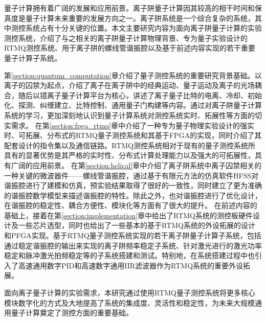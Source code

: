 
\begin{conclusion}

量子计算拥有着广阔的发展和应用前景。离子阱量子计算因其较高的相干时间和保真度是量子计算未来重要的发展方向之一。离子阱系统是一个综合复杂的系统，其中测控系统占有十分关键的位置。本文主要研究内容为面向离子阱量子计算的实验测控系统，介绍了与之相关的离子阱量子计算物理背景、专为量子实验设计的RTMQ测控系统、用于离子阱的螺线管谐振腔以及基于前述内容实现的若干重要量子计算子系统。

第\ref{section:quantum_computation}章介绍了量子测控系统的重要研究背景基础。以离子的囚禁为起点，介绍了离子在离子阱中的经典运动、量子运动及离子的光场耦合，随后以镱离子量子计算平台为核心，讲述了离子量子比特的电离、冷却、初始化、探测、纠缠建立、比特控制、通用量子门构建等内容。通过对离子阱量子计算系统的学习，更加深刻地认识到量子计算系统对测控系统实时、拓展性等方面的切实需求。
在第\ref{section:fpga_rtmq}章中介绍了一种专为量子物理实验设计的强实时、可拓展、分布式的RTMQ量子测控系统和其基于FPGA的实现，同时介绍了其配套设计的指令集以及通信链路。RTMQ测控系统相对于现有的量子测控系统所具有的显著优势是其严格的实时性、分布式计算处理能力以及强大的可拓展性，具有广阔的应用前景。
在第\ref{section:helical}章中介绍了离子阱系统中离子囚禁相关的一种关键的微波器件——螺线管谐振腔，通过基于有限元方法的仿真软件HFSS对谐振腔进行了建模和仿真，预实验结果取得了很好的一致性，同时建立了更为准确的谐振腔数学模型来描述谐振腔的特性。除此之外，也对谐振腔进行了优化设计，在谐振腔的稳定性、耦合方便性、模块化等方面有了很大的提升。
在前述内容的基础上，接着在第\ref{section:implementation}章中给出了RTMQ系统的测控板硬件设计及一些芯片选型，同时也给出了一些基本的基于RTMQ系统的外设拓展的设计和PFGA实现。基于RTMQ量子测控系统实现的若干离子阱量子计算子系统，包括通过稳定谐振腔的输出来实现的离子阱频率稳定子系统、针对激光进行的激光功率稳定和脉冲激光拍频稳定等的子系统搭建和测试。特别地，在系统搭建过程中也引入了高速通用数字PID和高速数字通用IIR滤波器作为RTMQ系统的重要外设拓展。

面向离子量子计算的实验需求，本研究通过使用RTMQ量子测控系统将更多核心模块数字化的方式及大地提高了系统的集成度、灵活性和稳定性，为未来大规模通用量子计算奠定了测控方面的重要基础。

\end{conclusion}


